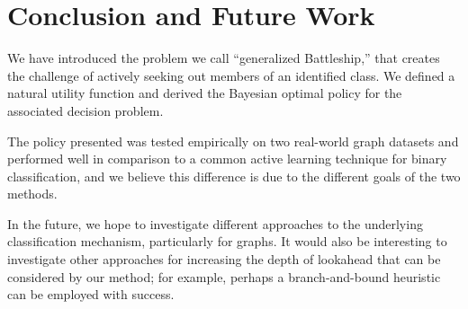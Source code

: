 \documentclass{article}
\begin{document}
\section{Conclusion and Future Work}

We have introduced the problem we call ``generalized Battleship,''
that creates the challenge of actively seeking out members of an
identified class.  We defined a natural utility function and derived
the Bayesian optimal policy for the associated decision problem.

The policy presented was tested empirically on two real-world graph
datasets and performed well in comparison to a common active learning
technique for binary classification, and we believe this difference is
due to the different goals of the two methods.

In the future, we hope to investigate different approaches to the
underlying classification mechanism, particularly for graphs.  It
would also be interesting to investigate other approaches for
increasing the depth of lookahead that can be considered by our
method; for example, perhaps a branch-and-bound heuristic can be
employed with success.


\end{document}
